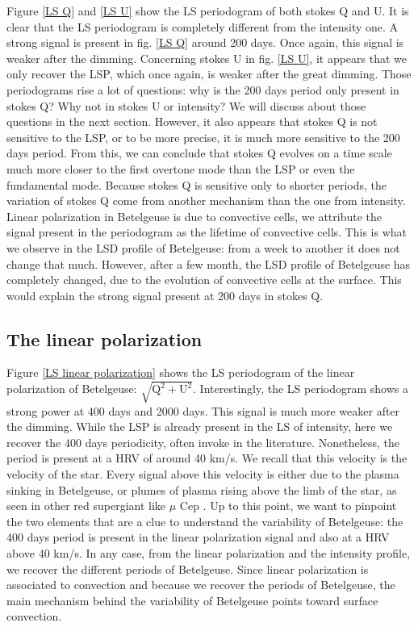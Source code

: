 \documentclass{aa}
\begin{document}
Figure \ref{LS Q} and \ref{LS U} show the LS periodogram of both stokes Q and U. It is clear that the LS periodogram is completely different 
from the intensity one. A strong signal is present in fig. \ref{LS Q} around 200 days. Once again, this signal is weaker after the dimming.
Concerning stokes U in fig. \ref{LS U}, it appears that we only recover the LSP, which once again, is weaker after the great dimming. 
Those periodograms rise a lot of questions: why is the 200 days period only present in stokes Q? Why not in stokes U or intensity? 
We will discuss about those questions in the next section. However, it also appears that stokes Q is not sensitive to the LSP, or to be more precise, 
it is much more sensitive to the 200 days period. From this, we can conclude that stokes Q evolves on a time scale much more closer to the first overtone 
mode than the LSP or even the fundamental mode. Because stokes Q is sensitive only to shorter periods, the variation of stokes Q come from another mechanism 
than the one from intensity. Linear polarization in Betelgeuse is due to convective cells, we attribute the signal present in the periodogram 
as the lifetime of convective cells. This is what we observe in the LSD profile of Betelgeuse: from a week to another it does not change that much. 
However, after a few month, the LSD profile of Betelgeuse has completely changed, due to the evolution of convective cells at the surface. 
This would explain the strong signal present at 200 days in stokes Q. 


\subsection{The linear polarization}

Figure \ref{LS linear polarization} shows the LS periodogram of the linear polarization of Betelgeuse: $\sqrt{\mathrm{Q^2+U^2}}$. 
Interestingly, the LS periodogram shows a strong power at 400 days and 2000 days. This signal is much more weaker after the dimming.
While the LSP is already present in the LS of intensity, here we recover the 400 days periodicity, often invoke in the literature. 
Nonetheless, the period is present at a HRV of around 40 km/s. We recall that this velocity is the velocity of the star. 
Every signal above this velocity is either due to the plasma sinking in Betelgeuse, or plumes of plasma rising above the limb of the star, 
as seen in other red supergiant like $\mu$ Cep \citep{lopez_ariste_height_2023}. Up to this point, we want to pinpoint the two elements that are a clue 
to understand the variability of Betelgeuse: the 400 days period is present in the linear polarization signal and also at a HRV above 40 km/s.
In any case, from the linear polarization and the intensity profile, we recover the different periods of Betelgeuse. Since linear polarization is 
associated to convection and because we recover the periods of Betelgeuse, the main mechanism behind the variability of Betelgeuse points toward surface convection.
\end{document}
